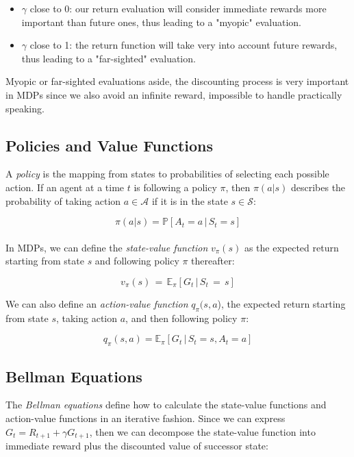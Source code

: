 \begin{itemize}
	\item $\gamma$ close to 0: our return evaluation will consider immediate rewards more important than future ones, thus leading to a "myopic" evaluation.
	\item $\gamma$ close to 1: the return function will take very  into account future rewards, thus leading to a "far-sighted" evaluation.
\end{itemize}

Myopic or far-sighted evaluations aside, the discounting process is very important in MDPs since we also avoid an infinite reward, impossible to handle practically speaking.

\subsection{Policies and Value Functions}
A \textit{policy} is the mapping from states to probabilities of selecting each possible action. If an agent at a time $t$ is following a policy $\pi$, then $\pi(a|s)$  describes the probability of taking action $a \in \mathcal{A}$ if it is in the state $s \in \mathcal{S}$:

\begin{equation}
	\pi(a|s)  =  \mathbb{P}[A_t  = a \, |\,  S_t=s]
\end{equation}
\\
\indent In MDPs, we can define the \textit{state-value function} $v_\pi(s)$ as the expected return starting from state $s$ and following policy $\pi$ thereafter:



\begin{equation}
	v_\pi(s) \, = \, \mathbb{E}_\pi [G_t \, | \, S_t\,=\,s]
\end{equation}

We can also define an \textit{action-value function} $q_\pi(s,a$), the expected return starting from state $s$, taking action $a$, and then following policy $\pi$:

\begin{equation}
	q_\pi(s,a) = \mathbb{E}_\pi[G_t \, | \, S_t = s, A_t = a]
\end{equation}

\subsection{Bellman Equations}
The \textit{Bellman equations} define how to calculate the state-value functions and action-value functions in an iterative fashion. Since we can express $G_t = R_{t+1} + \gamma G_{t+1}$, then we can decompose the state-value function into immediate reward plus the discounted value of successor state:

